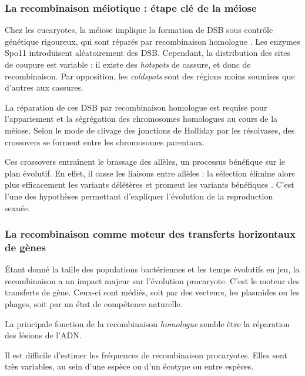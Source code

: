 \documentclass[11pt, oneside]{scrartcl}
\begin{document}
\subsubsection{La recombinaison méiotique : étape clé de la méiose}
\label{sec:orgheadline4}

Chez les eucaryotes, la méiose implique la formation de DSB sous contrôle
génétique rigoureux, qui sont réparés par recombinaison homologue
\cite{chapman_playing_2012}. Les enzymes Spo11 introduisent aléatoirement des
DSB. Cependant, la distribution des sites de coupure est variable : il existe
des \emph{hotspots} de cassure, et donc de recombinaison. Par opposition, les \emph{coldspots} 
sont des régions moins soumises que d'autres aux cassures.

La réparation de ces DSB par recombinaison homologue est requise pour
l'appariement et la ségrégation des chromosomes homologues au cours de la
méiose. Selon le mode de clivage des jonctions de Holliday par les résolvases,
des crossovers se forment entre les chromosomes parentaux. 

Ces crossovers entraînent le brassage des allèles, un processus bénéfique sur le
plan évolutif\cite{webster_direct_2012}. En effet, il casse les liaisons entre
allèles : la sélection élimine alors plus efficacement les variants délétères et
promeut les variants bénéfiques \cite{otto_resolving_2002}. C'est l'une des
hypothèses permettant d'expliquer l'évolution de la reproduction
sexuée\cite{otto_why_2006}.

\subsubsection{La recombinaison comme moteur des transferts horizontaux de gènes}
\label{sec:orgheadline5}

Étant donné la taille des populations bactériennes et les temps évolutifs en
jeu, la recombinaison a un impact majeur sur l'évolution
procaryote\cite{didelot_impact_2010}. C'est le moteur des transferts de gène.
Ceux-ci sont médiés, soit par des vecteurs, les plasmides ou les phages, soit
par un état de compétence naturelle.

La principale fonction de la recombinaison \emph{homologue} semble être la réparation
des lésions de l'ADN\cite{fall_horizontal_2007, michod_adaptive_2008}. 

Il est difficile d'estimer les fréquences de recombinaison procaryotes. Elles
sont très variables, au sein d'une espèce ou d'un écotype ou entre
espèces\cite{didelot_impact_2010}.
\end{document}
